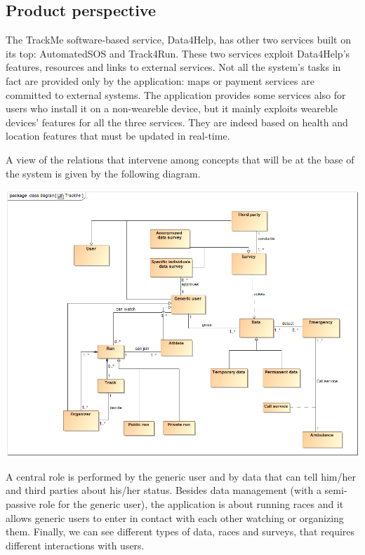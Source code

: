 
%

\subsection{Product perspective}
The TrackMe software-based service, Data4Help, has  other two services built on its top: AutomatedSOS and Track4Run. These two services exploit Data4Help's features, resources and links to external services. Not all the system's tasks in fact are provided only by the application: maps or payment services are committed to external systems. The application provides some services also for users who install it on a non-weareble device, but it mainly exploits weareble devices' features for all the three services. They are indeed based on health and location features that must be updated in real-time. \newline

A view of the relations that intervene among concepts that will be at the base of the system is given by the following diagram.

\begin{center}
\includegraphics[scale=0.5]{sections/diagrams/class_diagram.png}
\end{center}

A central role is performed by the generic user and by data that can tell him/her and third parties about his/her status. Besides data management (with a semi-passive role for the generic user), the application is about running races and it allows generic users to enter in contact with each other watching or organizing them. Finally, we can see different types of data, races and surveys, that requires different interactions with users.

